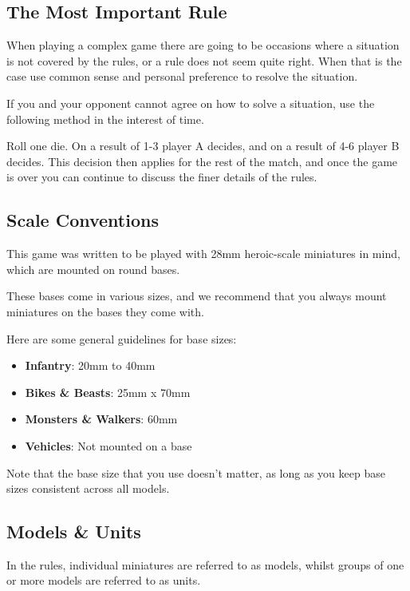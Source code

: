 \documentclass[9pt, a4paper]{extarticle}            %
\begin{document}
\begin{multicols}{2}

\subsection{The Most Important Rule}

When playing a complex game there are going to be occasions where a situation is not covered by the rules, or a rule does not seem quite right. When that is the case use common sense and personal preference to resolve the situation.

If you and your opponent cannot agree on how to solve a situation, use the following method in the interest of time.

Roll one die. On a result of 1-3 player A decides, and on a result of 4-6 player B decides. This decision then applies for the rest of the match, and once the game is over you can continue to discuss the finer details of the rules.

\subsection{Scale Conventions}

This game was written to be played with 28mm heroic-scale miniatures in mind, which are mounted on round bases.

These bases come in various sizes, and we recommend that you always mount miniatures on the bases they come with.

Here are some general guidelines for base sizes:

\begin{itemize}
  \item \textbf{Infantry}: 20mm to 40mm
  \item \textbf{Bikes \& Beasts}: 25mm x 70mm
  \item \textbf{Monsters \& Walkers}: 60mm
  \item \textbf{Vehicles}: Not mounted on a base
\end{itemize}

Note that the base size that you use doesn’t matter, as long as you keep base sizes consistent across all models.

\subsection{Models \& Units}

In the rules, individual miniatures are referred to as models, whilst groups of one or more models are referred to as units.


\end{multicols}
\end{document}
